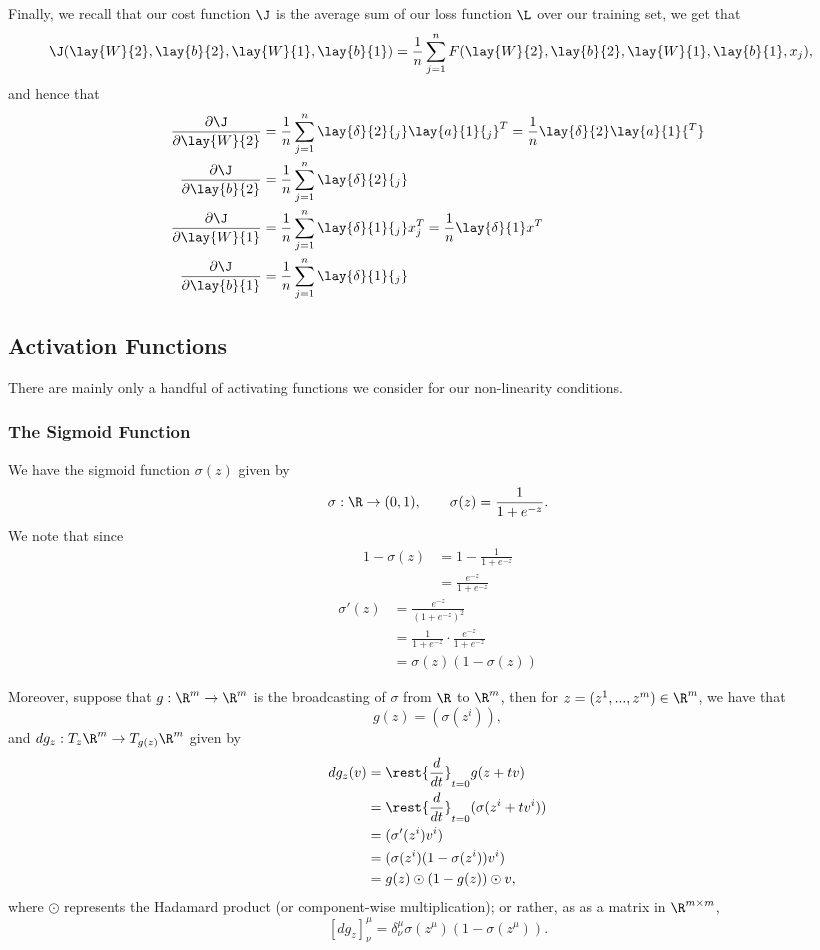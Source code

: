 Finally, we recall that our cost function $\J$ is the average sum of our loss function $\L$ over our training set, we get that
\begin{align*}
	\J(\lay{W}{2},\lay{b}{2},\lay{W}{1},\lay{b}{1})&=\frac{1}{n}\sum_{j=1}^nF(\lay{W}{2},\lay{b}{2},\lay{W}{1},\lay{b}{1},x_j),
\end{align*}
and hence that
\begin{align*}
	\frac{\partial\J}{\partial\lay{W}{2}}&=\frac{1}{n}\sum_{j=1}^n\lay{\delta}{2}{_j}\lay{a}{1}{_j}^T=\frac{1}{n}\lay{\delta}{2}\lay{a}{1}{^T}\\
	\frac{\partial\J}{\partial\lay{b}{2}}&=\frac{1}{n}\sum_{j=1}^n\lay{\delta}{2}{_j}\\
	\frac{\partial\J}{\partial\lay{W}{1}}&=\frac{1}{n}\sum_{j=1}^n\lay{\delta}{1}{_j}x_j^T=\frac{1}{n}\lay{\delta}{1}x^T\\
	\frac{\partial\J}{\partial\lay{b}{1}}&=\frac{1}{n}\sum_{j=1}^n\lay{\delta}{1}{_j}
\end{align*}


\subsection{Activation Functions}
There are mainly only a handful of activating functions we consider for our non-linearity conditions.  

\subsubsection{The Sigmoid Function}
We have the sigmoid function $\sigma(z)$ given by
$$\sigma:\R\to(0,1),\qquad \sigma(z)=\frac{1}{1+e^{-z}}.$$
We note that since
\begin{align*}
	1-\sigma(z)&=1-\frac{1}{1+e^{-z}}\\
	&=\frac{e^{-z}}{1+e^{-z}}
\end{align*}
\begin{align*}
	\sigma'(z)&=\frac{e^{-z}}{(1+e^{-z})^2}\\
	&=\frac{1}{1+e^{-z}}\cdot\frac{e^{-z}}{1+e^{-z}}\\
	&=\sigma(z)(1-\sigma(z))
\end{align*}

Moreover, suppose that $g:\R^m\to\R^m$ is the broadcasting of $\sigma$ from $\R$ to $\R^m$, then for $z=(z^1,...,z^m)\in\R^m$, we have that
$$g(z)=(\sigma(z^i)),$$
and $dg_z:T_z\R^m\to T_{g(z)}\R^m$ given by
\begin{align*}
	dg_z(v)&=\rest{\frac{d}{dt}}_{t=0}g(z+tv)\\
	&=\rest{\frac{d}{dt}}_{t=0}(\sigma(z^i+tv^i))\\
	&=(\sigma'(z^i)v^i)\\
	&=(\sigma(z^i)(1-\sigma(z^i))v^i)\\
	&=g(z)\odot(1-g(z))\odot v,
\end{align*}
where $\odot$ represents the Hadamard product (or component-wise multiplication); or rather, as as a matrix in $\R^{m\times m}$,
$$[dg_z]^\mu_\nu=\delta^\mu_\nu\sigma(z^\mu)(1-\sigma(z^\mu)).$$


